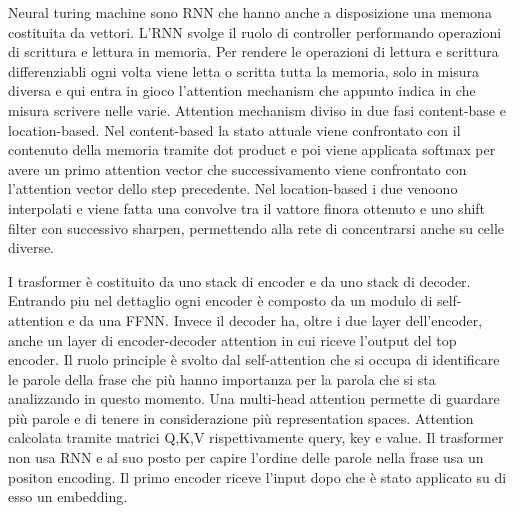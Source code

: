 \begin{box-stud}
    Neural turing machine sono RNN che hanno anche a disposizione una memona costituita da vettori. L'RNN svolge il ruolo di controller performando operazioni di scrittura e lettura in memoria. Per rendere le operazioni di lettura e scrittura differenziabli ogni volta viene letta o scritta tutta la memoria, solo in misura diversa e qui entra in gioco l’attention mechanism che appunto indica in che misura scrivere nelle varie. Attention mechanism diviso in due fasi content-base e location-based. Nel content-based la stato attuale viene confrontato con il contenuto della memoria tramite dot product e poi viene applicata softmax per avere un primo attention vector che successivamento viene confrontato con l'attention vector dello step precedente. Nel location-based i due venoono interpolati e viene fatta una convolve tra il vattore finora ottenuto e uno shift filter con successivo sharpen, permettendo alla rete di concentrarsi anche su celle diverse.
\end{box-stud}



\begin{box-stud}
    I trasformer è costituito da uno stack di encoder e da uno stack di decoder. Entrando piu nel dettaglio ogni encoder è composto da un modulo di self-attention e da una FFNN. Invece il decoder ha, oltre i due layer dell'encoder, anche un layer di encoder-decoder attention in cui riceve l'output del top encoder. Il ruolo principle è svolto dal self-attention che si occupa di identificare le parole della frase che più hanno importanza per la parola che si sta analizzando in questo momento. Una multi-head attention permette di guardare più parole e di tenere in considerazione più representation spaces. Attention calcolata tramite matrici Q,K,V rispettivamente query, key e value. Il trasformer non usa RNN e al suo posto per capire l’ordine delle parole nella frase usa un positon encoding. Il primo encoder riceve l'input dopo che è stato applicato su di esso un embedding.
\end{box-stud}


